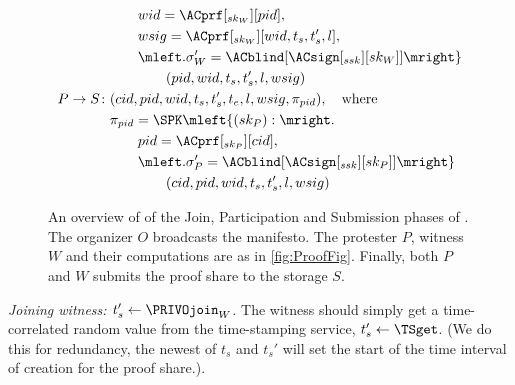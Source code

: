 \begin{figure}
\begin{minipage}{\linewidth}
\begin{align*}
        & \qquad wid = \ACprf[_{sk_W}][pid], \\
        & \qquad wsig = \ACprf[_{sk_W}][wid, t_s, t_s', l], \\
        & \qquad \mleft. \sigma_W' = \ACblind[\ACsign[_{ssk}][sk_W]]\mright\} \\
        & \qquad\qquad (pid, wid, t_s, t_s', l, wsig) \\
      P\to S\colon & (cid, pid, wid, t_s, t_s', t_e, l, wsig, \pi_{pid}),\quad 
      \text{where}\\
        & \pi_{pid} = \SPK\mleft\{ (sk_P) : \mright. \\
        & \qquad pid = \ACprf[_{sk_P}][cid], \\
        & \qquad \mleft. \sigma_P' = \ACblind[\ACsign[_{ssk}][sk_P]] \mright\} 
        \\
        & \qquad\qquad (cid, pid, wid, t_s, t_s', l, wsig)
    \end{align*}
  \end{minipage}
  \caption{%
    An overview of of the Join, Participation and Submission phases of \PRIVO.\@
    The organizer \(O\) broadcasts the manifesto.
    The protester \(P\), witness \(W\) and their computations are as in 
    \cref{fig:ProofFig}.
    Finally, both \(P\) and \(W\) submits the proof share to the storage \(S\).
  }%
  \label{fig:ProtocolOverview}
\end{figure}

\emph{Joining witness: \(t_s'\gets \PRIVOjoin_W\).}
The witness should simply get a time-correlated random value from the 
time-stamping service, \(t_s'\gets \TSget\).
(We do this for redundancy, the newest of \(t_s\) and \(t_s'\) will set the 
start of the time interval of creation for the proof share.).


